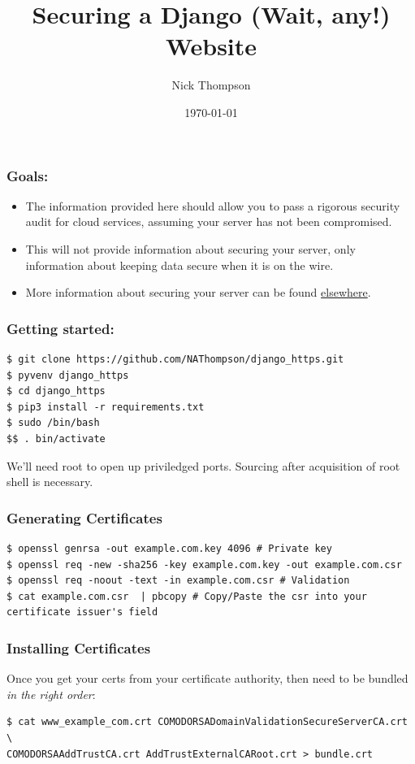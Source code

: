 \documentclass[9pt]{beamer}
\begin{document}
\title{Securing a Django (Wait, any!) Website}
\author{Nick Thompson} 
\date{\today}

\frame{\titlepage}

\begin{frame}[fragile]
\frametitle{Goals:}

\begin{itemize}
\item The information provided here should allow you to pass a rigorous security audit for cloud services, assuming your server has not been compromised.
\pause
\item This will not provide information about securing your server, only information about keeping data secure when it is on the wire.
\pause
\item More information about securing your server can be found \href{https://www.thefanclub.co.za/how-to/how-secure-ubuntu-1204-lts-server-part-1-basics}{elsewhere}.
\end{itemize}
\end{frame}


\begin{frame}[fragile]
\frametitle{Getting started:}
\begin{verbatim}
$ git clone https://github.com/NAThompson/django_https.git
$ pyvenv django_https
$ cd django_https
$ pip3 install -r requirements.txt
$ sudo /bin/bash
$$ . bin/activate
\end{verbatim}
\pause
We'll need root to open up priviledged ports. Sourcing after acquisition of root shell is necessary.
\end{frame}

\begin{frame}[fragile]
\frametitle{Generating Certificates}
\begin{verbatim}
$ openssl genrsa -out example.com.key 4096 # Private key
$ openssl req -new -sha256 -key example.com.key -out example.com.csr
$ openssl req -noout -text -in example.com.csr # Validation
$ cat example.com.csr  | pbcopy # Copy/Paste the csr into your certificate issuer's field
\end{verbatim}
\end{frame}

\begin{frame}[fragile]
\frametitle{Installing Certificates}
Once you get your certs from your certificate authority, then need to be bundled \emph{in the right order}:
\begin{verbatim}
$ cat www_example_com.crt COMODORSADomainValidationSecureServerCA.crt \
COMODORSAAddTrustCA.crt AddTrustExternalCARoot.crt > bundle.crt
\end{verbatim}
\end{frame}
\end{document}
